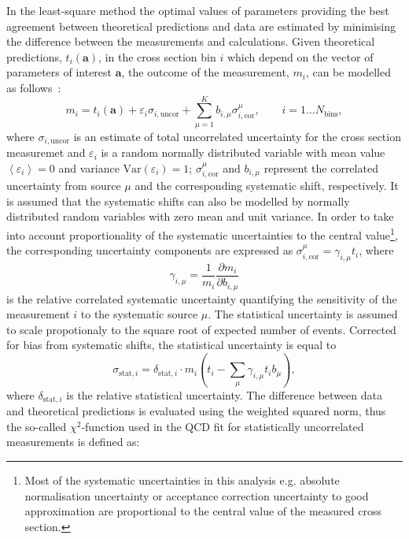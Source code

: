 In the least-square method the optimal values of parameters providing the best agreement between theoretical predictions and data are estimated by minimising the difference between the measurements and calculations. Given theoretical predictions, $t_i\left( \mathbf{a} \right)$, in the cross section bin $i$ which depend on the vector of parameters of interest $\mathbf{a}$, the outcome of the measurement, $m_i$, can be modelled as follows~\cite{Stump:2001gu,Botje:2001fx}:
\begin{equation}
 m_i = t_i\left( \mathbf{a} \right) + \varepsilon_{i} \sigma_{i,\text{uncor}} + \sum_{\mu=1}^{K}{b_{i,\mu}\sigma_{i,\text{cor}}^\mu}, \qquad i=1\ldots N_\text{bins},
\end{equation}
where $\sigma_{i,\text{uncor}}$ is an estimate of total uncorrelated uncertainty for the cross section measuremet and $\varepsilon_{i}$ is a random normally distributed variable with mean value $\left\langle \varepsilon_{i}\right\rangle = 0$ and variance $\text{Var}\left( \varepsilon_{i}\right) = 1$; $\sigma_{i,\text{cor}}^\mu$ and $b_{i,\mu}$ represent the correlated uncertainty from source $\mu$ and the corresponding systematic shift, respectively. It is assumed that the systematic shifts can also be modelled by normally distributed random variables with zero mean and unit variance. In order to take into account proportionality of the systematic uncertainties to the central value\footnote{Most of the systematic uncertainties in this analysis e.g. absolute normalisation uncertainty or acceptance correction uncertainty to good approximation are proportional to the central value of the measured cross section.}, the corresponding uncertainty components are expressed as $\sigma_{i,\text{cor}}^\mu = \gamma_{i,\mu}t_i$, where 
\begin{equation}
\gamma_{i,\mu}=\frac{1}{{m_i}} \frac{\partial m_i}{\partial b_{i,\mu}}
\end{equation}
is the relative correlated systematic uncertainty quantifying the sensitivity of the measurement $i$ to the systematic source $\mu$. The statistical uncertainty is assumed to scale propotionaly to the square root of expected number of events. Corrected for bias from systematic shifts, the statistical uncertainty is equal to
\begin{equation}
 \sigma_{\text{stat},i} = \delta_{\text{stat},i}\cdot m_i\left( t_i - \sum_\mu\gamma_{i,\mu}t_ib_\mu \right),
\end{equation}
where $\delta_{\text{stat},i}$ is the relative statistical uncertainty. The difference between data and theoretical predictions is evaluated using the weighted squared norm, thus the so-called $\chi^2$-function used in the QCD fit  for statistically uncorrelated measurements is defined as:
